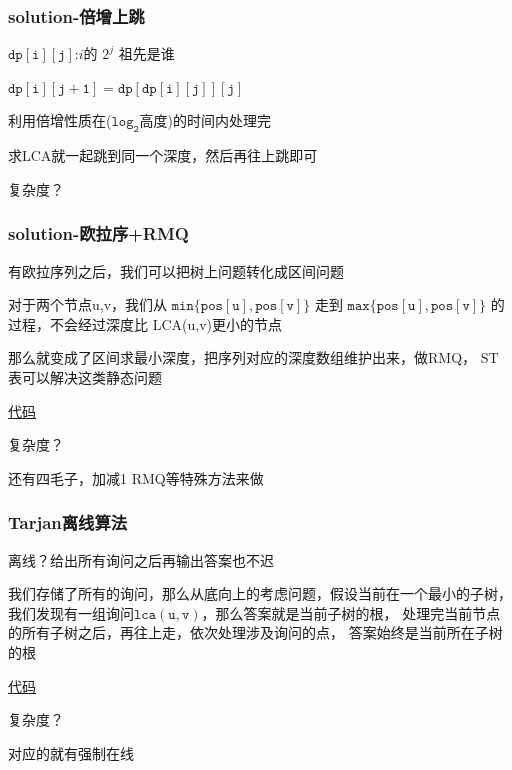 \documentclass{beamer}
\begin{document}
  \begin{frame}
    \frametitle{solution-倍增上跳}
      $\mathtt{dp[i][j]}$:$i$的 $2^j$ 祖先是谁

      \vspace*{1\baselineskip}
      
      $\mathtt{dp[i][j+1]=dp[dp[i][j]][j]}$
      
      \vspace*{1\baselineskip}
      
      利用倍增性质在($\mathtt{log_2}$高度)的时间内处理完
      
      \vspace*{1\baselineskip}
      
      求LCA就一起跳到同一个深度，然后再往上跳即可

      \vspace*{1\baselineskip}

      复杂度？
  \end{frame}

  \begin{frame}
    \frametitle{solution-欧拉序+RMQ}
    有欧拉序列之后，我们可以把树上问题转化成区间问题

    \vspace*{1\baselineskip}

    对于两个节点u,v，我们从 $\mathtt{min\{pos[u],pos[v]\}}$
    走到 $\mathtt{max\{pos[u],pos[v]\}}$ 的过程，不会经过深度比 LCA(u,v)更小的节点

    \pause
    \vspace*{1\baselineskip}
    
    那么就变成了区间求最小深度，把序列对应的深度数组维护出来，做RMQ，
    ST表可以解决这类静态问题

    \vspace*{1\baselineskip}

    \href{http://syh521.cn/file/lca-dfs-st.cpp}{代码}

    复杂度？
    
    \vspace*{1\baselineskip}

    还有四毛子，加减1 RMQ等特殊方法来做
  \end{frame}

  \begin{frame}
    \frametitle{Tarjan离线算法}
    离线？给出所有询问之后再输出答案也不迟

    \vspace*{1\baselineskip}
    
    我们存储了所有的询问，那么从底向上的考虑问题，假设当前在一个最小的子树，
    我们发现有一组询问$\mathtt{lca(u,v)}$，那么答案就是当前子树的根，
    处理完当前节点的所有子树之后，再往上走，依次处理涉及询问的点，
    答案始终是当前所在子树的根
    
    \vspace*{1\baselineskip}
    
    \href{http://syh521.cn/file/lca-tarjan.cpp}{代码}

    复杂度？
    
    \vspace*{1\baselineskip}
    
    对应的就有强制在线
  \end{frame}
\end{document}
